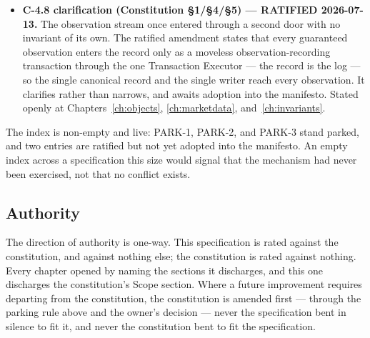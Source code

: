 \begin{itemize}
  adoption into the authoritative manifesto. Stated openly at Chapter~\ref{ch:valuation}.
\item \textbf{C-4.8 clarification (Constitution \S1/\S4/\S5) --- RATIFIED 2026-07-13.} The
  observation stream once entered through a second door with no invariant of its own. The
  ratified amendment states that every guaranteed observation enters the record only as a
  moveless observation-recording transaction through the one Transaction Executor --- the
  record is the log --- so the single canonical record and the single writer reach every
  observation. It clarifies rather than narrows, and awaits adoption into the manifesto.
  Stated openly at Chapters~\ref{ch:objects}, \ref{ch:marketdata}, and~\ref{ch:invariants}.
\end{itemize}

\noindent The index is non-empty and live: PARK-1, PARK-2, and PARK-3 stand parked, and two
entries are ratified but not yet adopted into the manifesto. An empty index across a
specification this size would signal that the mechanism had never been exercised, not that no
conflict exists.

\subsection{Authority}

The direction of authority is one-way. This specification is rated against the
constitution, and against nothing else; the constitution is rated against nothing. Every
chapter opened by naming the sections it discharges, and this one discharges the
constitution's Scope section. Where a future improvement requires departing from the
constitution, the constitution is amended first --- through the parking rule above and the
owner's decision --- never the specification bent in silence to fit it, and never the
constitution bent to fit the specification.
